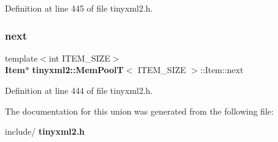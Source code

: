 Definition at line 445 of file tinyxml2.\+h.

\mbox{\label{uniontinyxml2_1_1_mem_pool_t_1_1_item_a5620107f518c60d6619e8662d4c9d643}} 
\subsubsection{next}
{\footnotesize\ttfamily template$<$int I\+T\+E\+M\+\_\+\+S\+I\+ZE$>$ \\
\textbf{ Item}$\ast$ \textbf{ tinyxml2\+::\+Mem\+PoolT}$<$ I\+T\+E\+M\+\_\+\+S\+I\+ZE $>$\+::Item\+::next}



Definition at line 444 of file tinyxml2.\+h.



The documentation for this union was generated from the following file\+:\begin{DoxyCompactItemize}
\item 
include/\textbf{ tinyxml2.\+h}\end{DoxyCompactItemize}
